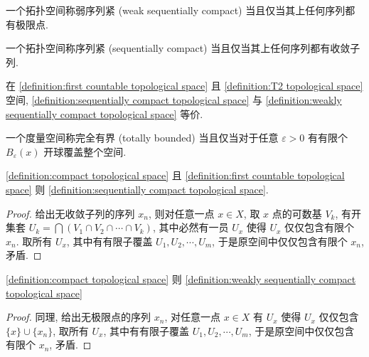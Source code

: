 \begin{definition}[弱序列紧]
    \label {definition:weakly sequentially compact topological space}
    一个拓扑空间称弱序列紧 (weak sequentially compact) 当且仅当其上任何序列都有极限点.
\end{definition}

\begin{definition}[序列紧]
    \label {definition:sequentially compact topological space}
    一个拓扑空间称序列紧 (sequentially compact) 当且仅当其上任何序列都有收敛子列.
\end{definition}

\begin{corollary}
    在 \ref{definition:first countable topological space} 且 \ref{definition:T2 topological space} 空间, 
    \ref{definition:sequentially compact topological space} 与 \ref{definition:weakly sequentially compact topological space} 等价.
\end{corollary}

\begin{definition}[完全有界]
    \label {definition:totally bounded topological space}
    一个度量空间称完全有界 (totally bounded) 当且仅当对于任意 \(\varepsilon > 0\) 有有限个 \(B_\varepsilon (x)\) 开球覆盖整个空间.
\end{definition}

\begin{lemma}
    \ref{definition:compact topological space} 且 \ref{definition:first countable topological space} 则 \ref{definition:sequentially compact topological space}.

    \begin{proof}
        给出无收敛子列的序列 \(x_n\), 则对任意一点 \(x \in X\), 取 \(x\) 点的可数基 \(V_k\), 有开集套 \(U_k = \bigcap (V_1 \cap V_2 \cap \cdots \cap V_k)\),
        其中必然有一员 \(U_x\) 使得 \(U_x\) 仅仅包含有限个 \(x_n\).
        取所有 \(U_x\), 其中有有限子覆盖 \(U_{1}, U_{2}, \cdots, U_{m}\), 于是原空间中仅仅包含有限个 \(x_n\), 矛盾.
    \end{proof}
\end{lemma}

\begin{lemma}
    \ref{definition:compact topological space} 则 \ref{definition:weakly sequentially compact topological space}

    \begin{proof}
        同理, 给出无极限点的序列 \(x_n\), 对任意一点 \(x \in X\) 有 \(U_x\) 使得 \(U_x\) 仅仅包含 \(\{x\} \cup \{x_n\}\),
        取所有 \(U_x\), 其中有有限子覆盖 \(U_{1}, U_{2}, \cdots, U_{m}\), 于是原空间中仅仅包含有限个 \(x_n\), 矛盾.
    \end{proof}
\end{lemma}

